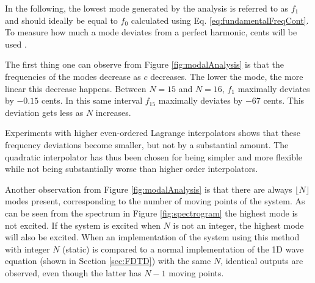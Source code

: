In the following, %
the lowest mode generated by the analysis is referred to as $f_1$ and should ideally be equal to $f_0$ calculated using Eq. \eqref{eq:fundamentalFreqCont}. To measure how much a mode deviates from a perfect harmonic, cents will be used \SWcomment[according to $\varepsilon = 1200\cdot\text{log}_2(f_p / pf_0)$].

The first thing one can observe from Figure \ref{fig:modalAnalysis} is that the frequencies of the modes decrease as $c$ decreases. The lower the mode, the more linear this decrease happens. Between $N = 15$ and $N = 16$, $f_1$ maximally deviates by $-0.15$ cents. In this same interval $f_{15}$ maximally deviates by $-67$ cents. This deviation %
gets %
less as $N$ increases. %

Experiments with higher even-ordered Lagrange interpolators shows that these frequency deviations become smaller, but not by a substantial amount. The quadratic interpolator has thus been chosen for being simpler and more flexible while not being substantially worse than higher order interpolators.

Another observation from Figure \ref{fig:modalAnalysis} is that there are always $\lfloor N \rfloor$ modes present, corresponding to the number of moving points of the system. As can be seen from the spectrum in Figure \ref{fig:spectrogram} the highest mode is not excited. If the system is excited when $N$ is not an integer, the highest mode will also be excited.
When an implementation of the system using this method with integer $N$ (static) is compared to a normal implementation of the 1D wave equation (shown in Section \ref{sec:FDTD}) with the same $N$, identical outputs are observed, even though the latter has $N-1$ moving points. 

